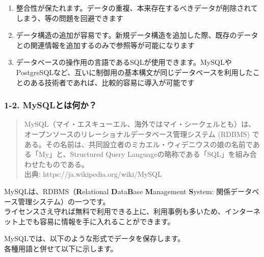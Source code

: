 \begin{enumerate}
\def\labelenumi{\arabic{enumi}.}
\tightlist
\item
  整合性が保たれます。データの重複、本来存在するべきデータが削除されてしまう、等の問題を回避できます
\item
  データ構造の追加が容易です。新規データ構造を追加した際、既存のデータとの関連情報を追加するのみで参照等が可能になります
\item
  データベースの操作用の言語であるSQLが使用できます。MySQLやPostgreSQLなど、互いに制御用の基本構文が同じデータベースを利用したことのある技術者であれば、比較的容易に導入が可能です
\end{enumerate}

\subsubsection{1-2.
MySQLとは何か？}\label{mysqlux3068ux306fux4f55ux304b}

\begin{quote}
MySQL（マイ・エスキューエル、海外ではマイ・シークェルとも）は、オープンソースのリレーショナルデータベース管理システム
(RDBMS)
である。その名前は、共同設立者のミカエル・ウィデニウスの娘の名前である「My」と、Structured
Query Languageの略称である「SQL」を組み合わせたものである。\\
出典: https://ja.wikipedia.org/wiki/MySQL
\end{quote}

MySQLは、RDBMS（\textbf{R}elational \textbf{D}ata\textbf{B}ase
\textbf{M}anagement \textbf{S}ystem:
関係データベース管理システム）の一つです。\\
ライセンスさえ守れば無料で利用できる上に、利用事例も多いため、インターネット上でも容易に情報を手に入れることができます。

MySQLでは、以下のような形式でデータを保存します。\\
各種用語と併せて以下に示します。

